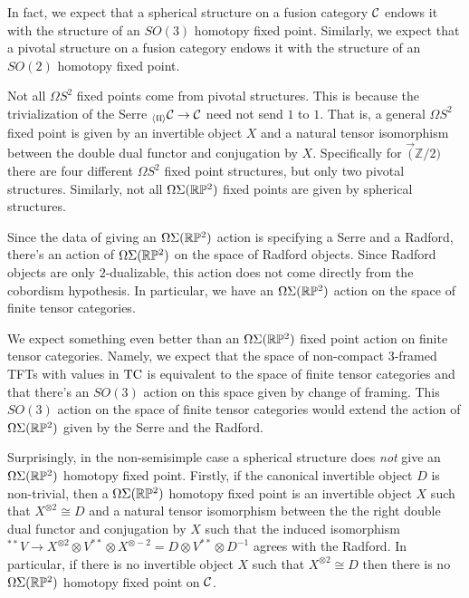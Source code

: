 \documentclass{amsart}
\begin{document}
\begin{remark}
In fact, we expect that a spherical structure on a fusion category $\mathcal C$ endows it with the structure of an $SO(3)$ homotopy fixed point.   Similarly, we expect that a pivotal structure on a fusion category endows it with the structure of an $SO(2)$ homotopy fixed point. 
\end{remark}


\begin{warning}
Not all $\Omega S^2$ fixed points come from pivotal structures.  This is because the trivialization of the Serre ${}_{\langle \mathfrak{l l} \rangle} \mathcal C \rightarrow \mathcal C$ need not send $1$ to $1$.  That is, a general $\Omega S^2$ fixed point is given by an invertible object $X$ and a natural tensor isomorphism between the double dual functor and conjugation by $X$.  Specifically for $\Vec(\mathbb{Z}/2)$ there are four different $\Omega S^2$ fixed point structures, but only two pivotal structures.  Similarly, not all $\Omega \Sigma (\mathbb R \mathbb P^2)$ fixed points are given by spherical structures.
\end{warning}

Since the data of giving an $\Omega \Sigma (\mathbb R \mathbb P^2)$ action is specifying a Serre and a Radford, there's an action of $\Omega \Sigma (\mathbb R \mathbb P^2)$ on the space of Radford objects.  Since Radford objects are only $2$-dualizable, this action does not come directly from the cobordism hypothesis.  In particular, we have an $\Omega \Sigma (\mathbb R \mathbb P^2)$ action on the space of finite tensor categories.  

\begin{remark}
We expect something even better than an $\Omega \Sigma (\mathbb R \mathbb P^2)$ fixed point action on finite tensor categories.  Namely, we expect that the space of non-compact $3$-framed TFTs with values in $\mathrm{TC}$ is equivalent to the space of finite tensor categories and that there's an $SO(3)$ action on this space given by change of framing.  This $SO(3)$ action on the space of finite tensor categories would extend the action of $\Omega \Sigma (\mathbb R \mathbb P^2)$ given by the Serre and the Radford.
 \end{remark}

Surprisingly, in the non-semisimple case a spherical structure does \emph{not} give an $\Omega \Sigma (\mathbb R \mathbb P^2)$ homotopy fixed point.  Firstly, if the canonical invertible object $D$ is non-trivial, then a $\Omega \Sigma (\mathbb R \mathbb P^2)$ homotopy fixed point is an invertible object $X$ such that $X^{\otimes 2} \cong D$ and a natural tensor isomorphism between the the right double dual functor and conjugation by $X$ such that the induced isomorphism ${}^{**}V \rightarrow X^{\otimes 2} \otimes V^{**} \otimes X^{\otimes -2} = D \otimes V^{**} \otimes D^{-1}$ agrees with the Radford.  In particular, if there is no invertible object $X$ such that $X^{\otimes 2} \cong D$ then there is no $\Omega \Sigma (\mathbb R \mathbb P^2)$ homotopy fixed point on $\mathcal C$.
\end{document}
